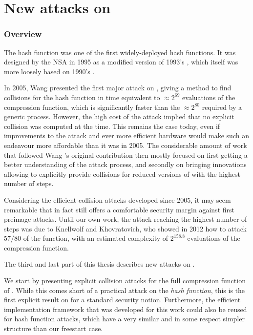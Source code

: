 \part[Nouvelles attaques sur \shaone]
    {New attacks on \shaone} 
\label{part:sha-1}

\section*{Overview}
\pagestyle{plain}

The \shaone hash function was one of the first widely-deployed hash functions. It was designed by the NSA in 1995 as a modified version of 1993's \shazero, which itself
was more loosely based on 1990's \mdfour.

In 2005, Wang \etal presented the first major attack on \shaone, giving a method to find collisions for the hash function
in time equivalent to $\approx 2^{69}$ evaluations of the compression function, which is significantly faster than the $\approx 2^{80}$ required by a generic process.
However, the high cost of the attack implied that no explicit collision was computed at the time. This remains the case today, even if improvements to the attack
and ever more efficient hardware would make such an endeavour more affordable than it was in 2005.
The considerable amount of work that followed Wang \etal's original contribution then mostly focused on first getting a better understanding of the attack process, and
secondly on bringing innovations allowing to explicitly provide collisions for reduced versions of \shaone with the highest number of steps. 

Considering the efficient collision attacks developed since 2005, it may seem remarkable that \shaone
in fact still offers a comfortable security margin against first preimage attacks. Until our own work,
the attack reaching the highest number of steps was due to Knellwolf and Khovratovich, who showed in 2012 how to attack $57/80$ of the function, with an estimated
complexity of $2^{158.8}$ evaluations of the compression function.


\bigskip

The third and last part of this thesis describes new attacks on \shaone.

We start by presenting explicit collision attacks for the full compression function of \shaone. While this comes short of a practical
attack on the \emph{hash function}, this is the first explicit result on \shaone for a standard security notion. Furthermore, the efficient implementation framework that was developed
for this work could also be reused for hash function attacks, which have a very similar and in some respect simpler structure than our freestart case.

